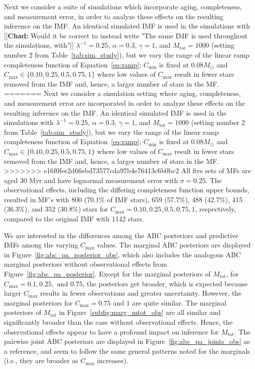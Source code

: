 \documentclass[ejs]{imsart}
\numberwithin{equation}{section}
\theoremstyle{plain}
\newcommand{\chad}[1]{{\color{red}[[\textbf{Chad: }#1]]}}
\newcommand{\Msun}{M_{\odot}}
\newcommand{\Cmin}{C_{\text{min}}}
\newcommand{\Cmax}{C_{\text{max}}}
\newcommand{\Mtot}{M_{\text{tot}}}
\begin{document}
Next we consider a suite of simulations which incorporate
aging, completeness, and measurement error, in order to analyze these effects on the resulting inference on the IMF.  
An identical simulated IMF is used in the simulations with 
\chad{Would it be correct to instead write "The same IMF is used throughout the simulations, with"}
$\lambda^{-1} = 0.25$, $\alpha = 0.3$, $\gamma = 1$, and $\Mtot = 1000$ (setting number 2 from Table~\ref{tab:sim_study}), but we vary the range of the linear ramp completeness function of Equation~\eqref{eq:ramp}; $\Cmin$ is fixed at 0.08$\Msun$ and $\Cmax \in \{0.10, 0.25, 0.5, 0.75, 1\}$ where low values of $\Cmax$ result in fewer stars removed from the IMF and, hence, a larger number of stars in the MF.  
=======
Next we consider a simulation setting where aging, completeness, and measurement error are incorporated in order to analyze these effects on the resulting inference on the IMF.  
An identical simulated IMF is used in the simulations with $\lambda^{-1} = 0.25$, $\alpha = 0.3$, $\gamma = 1$, and $\Mtot = 1000$ (setting number 2 from Table~\ref{tab:sim_study}), but we vary the range of the linear ramp completeness function of Equation~\eqref{eq:ramp}; $\Cmin$ is fixed at 0.08$\Msun$ and $\Cmax \in \{0.10, 0.25, 0.5, 0.75, 1\}$ where low values of $\Cmax$ result in fewer stars removed from the IMF and, hence, a larger number of stars in the MF.  
>>>>>>> e16f0fee2d66ebd73577cda97b4e76413c6b0bc2
All five sets of MFs are aged 30 Myr and have lognormal measurement error with $\sigma = 0.25$.  
The observational effects, including the differing completeness function upper bounds, resulted in MF's with 800 (70.1\% of IMF stars), 659 (57.7\%), 488 (42.7\%), 415 (36.3\%), and 352 (30.8\%) stars for $\Cmax = 0.10, 0.25, 0.5, 0.75, 1$, respectively, compared to the original IMF with 1142 stars.

We are interested in the differences among the ABC posteriors and predictive IMFs among the varying $\Cmax$ values.  
The marginal ABC posteriors are displayed in Figure~\ref{fig:abc_pa_posterior_obs}, which also includes the analogous ABC marginal posteriors without observational effects from Figure~\ref{fig:abc_pa_posterior}.  
Except for the marginal posteriors of $\Mtot$, for $\Cmax = 0.1, 0.25, \text{ and } 0.75$, the posteriors get broader, which is expected because larger $\Cmax$ results in fewer observations and greater uncertainty.  
However, the marginal posteriors for $\Cmax = 0.75$ and $1$ are quite similar. The marginal posteriors of $\Mtot$ in Figure~\ref{subfig:marg_mtot_obs} are all similar and significantly broader than the case without observational effects.  Hence, the observational effects appear to have a profound impact on inference for $\Mtot$.  The pairwise joint ABC posteriors are displayed in Figure~\ref{fig:abc_pa_joints_obs} as a reference, and seem to follow the same general patterns noted for the marginals (i.e., they are broader as $\Cmax$ increases).
\end{document}
